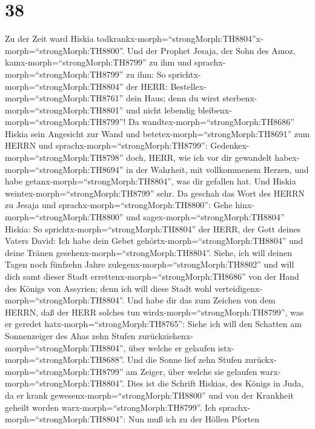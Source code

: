 \hypertarget{section-37}{%
\section{38}\label{section-37}}

 Zu der Zeit ward Hiskia
todkrankx-morph=``strongMorph:TH8804''x-morph=``strongMorph:TH8800''.
Und der Prophet Jesaja, der Sohn des Amoz,
kamx-morph=``strongMorph:TH8799'' zu ihm und
sprachx-morph=``strongMorph:TH8799'' zu ihm: So
sprichtx-morph=``strongMorph:TH8804'' der HERR:
Bestellex-morph=``strongMorph:TH8761'' dein Haus; denn du wirst
sterbenx-morph=``strongMorph:TH8801'' und nicht lebendig
bleibenx-morph=``strongMorph:TH8799''!  Da
wandtex-morph=``strongMorph:TH8686'' Hiskia sein Angesicht zur Wand und
betetex-morph=``strongMorph:TH8691'' zum HERRN  und
sprachx-morph=``strongMorph:TH8799'':
Gedenkex-morph=``strongMorph:TH8798'' doch, HERR, wie ich vor dir
gewandelt habex-morph=``strongMorph:TH8694'' in der Wahrheit, mit
vollkommenem Herzen, und habe getanx-morph=``strongMorph:TH8804'', was
dir gefallen hat. Und Hiskia weintex-morph=``strongMorph:TH8799'' sehr.
 Da geschah das Wort des HERRN zu Jesaja und
sprachx-morph=``strongMorph:TH8800'':  Gehe
hinx-morph=``strongMorph:TH8800'' und sagex-morph=``strongMorph:TH8804''
Hiskia: So sprichtx-morph=``strongMorph:TH8804'' der HERR, der Gott
deines Vaters David: Ich habe dein Gebet
gehörtx-morph=``strongMorph:TH8804'' und deine Tränen
gesehenx-morph=``strongMorph:TH8804''. Siehe, ich will deinen Tagen noch
fünfzehn Jahre zulegenx-morph=``strongMorph:TH8802''  und
will dich samt dieser Stadt errettenx-morph=``strongMorph:TH8686'' von
der Hand des Königs von Assyrien; denn ich will diese Stadt wohl
verteidigenx-morph=``strongMorph:TH8804''.  Und habe dir das
zum Zeichen von dem HERRN, daß der HERR solches tun
wirdx-morph=``strongMorph:TH8799'', was er geredet
hatx-morph=``strongMorph:TH8765'':  Siehe ich will den
Schatten am Sonnenzeiger des Ahas zehn Stufen
zurückziehenx-morph=``strongMorph:TH8804'', über welche er gelaufen
istx-morph=``strongMorph:TH8688''. Und die Sonne lief zehn Stufen
zurückx-morph=``strongMorph:TH8799'' am Zeiger, über welche sie gelaufen
warx-morph=``strongMorph:TH8804''.  Dies ist die Schrift
Hiskias, des Königs in Juda, da er krank
gewesenx-morph=``strongMorph:TH8800'' und von der Krankheit geheilt
worden warx-morph=``strongMorph:TH8799''.  Ich
sprachx-morph=``strongMorph:TH8804'': Nun muß ich zu der Höllen Pforten
